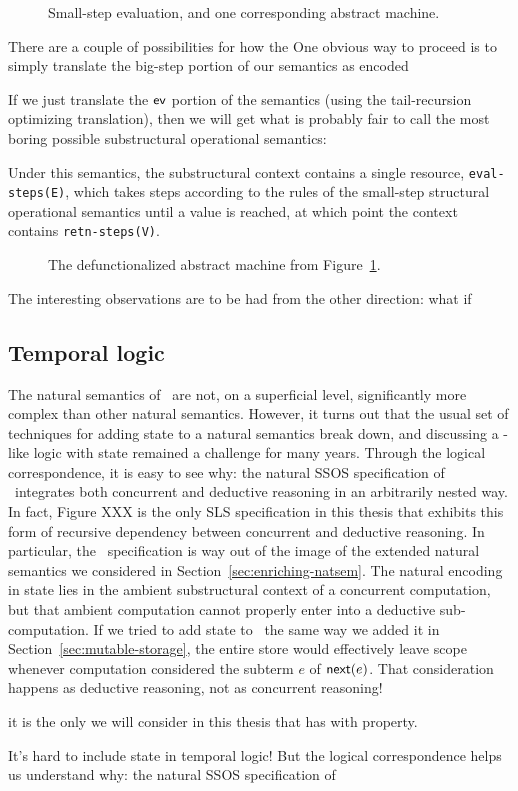 \begin{figure}[tp]
\caption{Small-step evaluation, and one corresponding abstract machine.}
\label{fig:cbv-sos}
\end{figure}


There are a couple of possibilities for how the 
One obvious way to proceed is to simply translate the big-step portion
of our semantics as encoded 


If we just translate the ${\sf ev}$ portion of the semantics (using
the tail-recursion optimizing translation), then we will get what is
probably fair to call the most boring possible substructural
operational semantics: 

\smallskip
{}
\smallskip

\noindent
Under this semantics, the substructural context contains a single
resource, \Verb|eval-steps(E)|, which takes steps according to the
rules of the small-step structural operational semantics until a value
is reached, at which point the context contains \Verb|retn-steps(V)|.


\begin{figure}[t]
\caption{The defunctionalized abstract machine from Figure~\ref{fig:cbv-sos}.}
\label{fig:cbv-sos-defun}
\end{figure}

The interesting observations are to be had from the other direction: what if

\subsection{Temporal logic}

The natural semantics of \rowan~are not, on a superficial level,
significantly more complex than other natural semantics. However, it
turns out that the usual set of techniques for adding state to a
natural semantics break down, and discussing a \rowan-like logic with
state remained a challenge for many years. Through the
logical correspondence, it is easy to see why: the natural SSOS
specification of \rowan~integrates both concurrent and deductive
reasoning in an arbitrarily nested way. In fact, Figure XXX is the
only SLS specification in this thesis that exhibits this form of
recursive dependency between concurrent and deductive reasoning.  In
particular, the \rowan~specification is way out of the image of the
extended natural semantics we considered in
Section~\ref{sec:enriching-natsem}. The natural encoding in state lies
in the ambient substructural context of a concurrent computation, but
that ambient computation cannot properly enter into a deductive
sub-computation. If we tried to add state to \rowan~the same way we
added it in Section~\ref{sec:mutable-storage}, the entire store
would effectively leave scope whenever computation considered
the subterm $e$ of ${\sf next}(e)$. That consideration happens
as deductive reasoning, not as concurrent reasoning!

 it is the only we
will consider in this thesis that has with property.

It's hard to include state in temporal logic! But the logical correspondence
helps us understand why: the natural SSOS specification of 